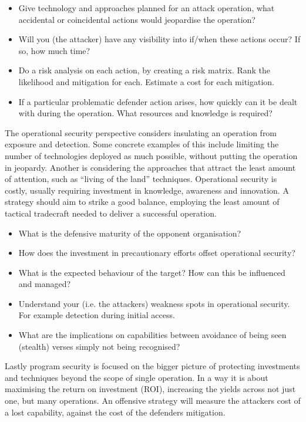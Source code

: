 \documentclass[11pt]{report}
\begin{document}
\begin{itemize}
	\item Give technology and approaches planned for an attack operation, what accidental or coincidental actions would jeopardise the operation?
	\item Will you (the attacker) have any visibility into if/when these actions occur? If so, how much time?
	\item Do a risk analysis on each action, by creating a risk matrix. Rank the likelihood and mitigation for each. Estimate a cost for each mitigation.
	\item If a particular problematic defender action arises, how quickly can it be dealt with during the operation. What resources and knowledge is required?
\end{itemize}


The operational security perspective considers insulating an operation from exposure and detection. Some concrete examples of this include limiting the number of technologies deployed as much possible, without putting the operation in jeopardy. Another is considering the approaches that attract the least amount of attention, such as “living of the land” techniques. Operational security is costly, usually requiring investment in knowledge, awareness and innovation. A strategy should aim to strike a good balance, employing the least amount of tactical tradecraft needed to deliver a successful operation.

\begin{itemize}
	\item What is the defensive maturity of the opponent organisation?
	\item How does the investment in precautionary efforts offset operational security?
	\item What is the expected behaviour of the target? How can this be influenced and managed?
	\item Understand your (i.e. the attackers) weakness spots in operational security. For example detection during initial access.
	\item What are the implications on capabilities between avoidance of being seen (stealth) verses simply not being recognised?
\end{itemize}


Lastly program security is focused on the bigger picture of protecting investments and techniques beyond the scope of single operation. In a way it is about maximising the return on investment (ROI), increasing the yields across not just one, but many operations. An offensive strategy will measure the attackers cost of a lost capability, against the cost of the defenders mitigation.
\end{document}
